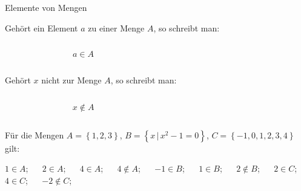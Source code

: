 \documentclass[12pt,ngerman,a4paper,ignorenonframetext,]{beamer}
\begin{document}
\begin{frame}{Elemente von Mengen}
\protect\hypertarget{elemente-von-mengen}{}


\begin{definition}

Gehört ein Element \(a\) zu einer Menge \(A\), so schreibt man:

\begin{columns}[T]
\begin{column}{0.49\textwidth}
\[ a \in A \]
\end{column}

\begin{column}{0.49\textwidth}
\end{column}
\end{columns}

Gehört \(x\) nicht zur Menge \(A\), so schreibt man:

\begin{columns}[T]
\begin{column}{0.49\textwidth}
\[ x \notin A \]
\end{column}

\begin{column}{0.49\textwidth}
\end{column}
\end{columns}

\end{definition}


\begin{Beispiele}[]

Für die Mengen \(A = \left\{1,2,3\right\}\),
\(B = \left\{x \,|\, x^2-1=0\right\}\),
\(C=\left\{-1,0,1,2,3,4\right\}\) gilt:

\(1 \in A\); \(\quad\) \(2 \in A\); \(\quad\) \(4 \in A\); \(\quad\)
\(4 \notin A\); \(\quad\) \(-1 \in B\); \(\quad\) \(1 \in B\); \(\quad\)
\(2 \notin B\); \(\quad\) \(2 \in C\); \(\quad\) \(4 \in C\); \(\quad\)
\(-2 \notin C\);

\end{Beispiele}

\end{frame}
\end{document}
